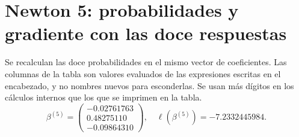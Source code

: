 \documentclass[11pt,a4paper]{article}
\begin{document}
\clearpage
\section{Newton 5: probabilidades y gradiente con las doce respuestas}\label{logit106}
Se recalculan las doce probabilidades en el mismo vector
de coeficientes. Las columnas de la tabla son valores evaluados
de las expresiones escritas en el encabezado, y no nombres nuevos
para esconderlas. Se usan más dígitos en los cálculos internos
que los que se imprimen en la tabla.
\[
\beta^{(5)}=\begin{pmatrix}-0.02761763\\0.48275110\\-0.09864310\end{pmatrix},\quad \ell(\beta^{(5)})=-7.2332445984.
\]
\end{document}
